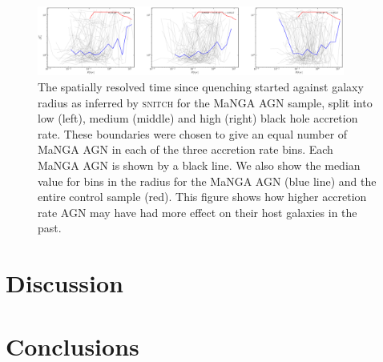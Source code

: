 \documentclass[useAMS,usenatbib]{mn2e}
\begin{document}
\begin{figure}
\includegraphics[width=0.9\textwidth]{../data/ellison/figures/median_deltatq_with_kpc_radius_ellison_splitmdot.png}
\caption{The spatially resolved time since quenching started against galaxy radius as inferred by \textsc{snitch} for the MaNGA AGN sample, split into low (left), medium (middle) and high (right) black hole accretion rate. These boundaries were chosen to give an equal number of MaNGA AGN in each of the three accretion rate bins. Each MaNGA AGN is shown by a black line. We also show the median value for bins in the radius for the MaNGA AGN (blue line) and the entire control sample (red). This figure shows how higher accretion rate AGN may have had more effect on their host galaxies in the past.}
\end{figure}


\section{Discussion}\label{sec:disc}

\section{Conclusions}\label{sec:conc}


  
\end{document}
